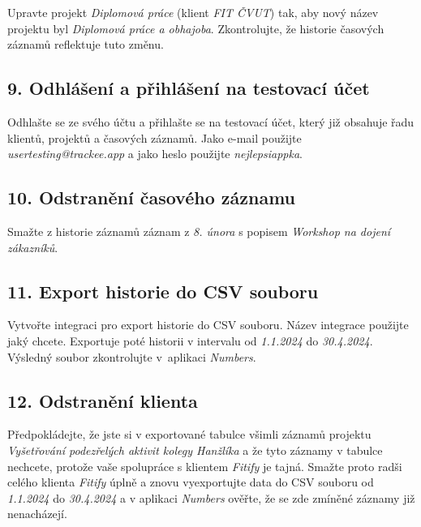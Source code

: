 Upravte projekt \emph{Diplomová práce} (klient \emph{FIT ČVUT}) tak, aby nový název projektu byl \emph{Diplomová práce a obhajoba}. Zkontrolujte, že historie časových záznamů reflektuje tuto změnu.

\subsection*{9. Odhlášení a přihlášení na testovací účet}

Odhlašte se ze svého účtu a přihlašte se na testovací účet, který již obsahuje řadu klientů, projektů a časových záznamů. Jako e-mail použijte \emph{usertesting@trackee.app} a jako heslo použijte \emph{nejlepsiappka}.

\subsection*{10. Odstranění časového záznamu}

Smažte z historie záznamů záznam z \emph{8. února} s popisem \emph{Workshop na dojení zákazníků}.

\subsection*{11. Export historie do CSV souboru}

Vytvořte integraci pro export historie do CSV souboru. Název integrace použijte jaký chcete. Exportuje poté historii v intervalu od \emph{1.1.2024} do \emph{30.4.2024}. Výsledný soubor zkontrolujte v aplikaci \emph{Numbers}.

\subsection*{12. Odstranění klienta}

Předpokládejte, že jste si v exportované tabulce všimli záznamů projektu \emph{Vyšetřování podezřelých aktivit kolegy Hanžlíka} a že tyto záznamy v tabulce nechcete, protože vaše spolupráce s klientem \emph{Fitify} je tajná. Smažte proto radši celého klienta \emph{Fitify} úplně a znovu vyexportujte data do CSV souboru od \emph{1.1.2024} do \emph{30.4.2024} a v aplikaci \emph{Numbers} ověřte, že se zde zmíněné záznamy již nenacházejí.

